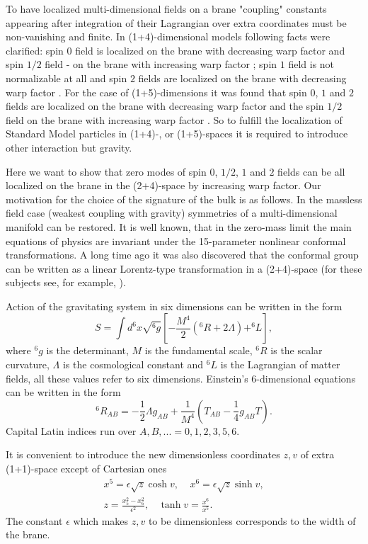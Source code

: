 \documentclass[a4paper,a4paper]{article}
\begin{document}
To have localized multi-dimensional fields on a brane "coupling"
constants appearing after integration of their Lagrangian over
extra coordinates must be non-vanishing and finite. In
(1+4)-dimensional models following facts were clarified: spin $0$
field is localized on the brane with decreasing warp factor and
spin $1/2$ field - on the brane with increasing warp factor
\cite{BaGa}; spin $1$ field is not normalizable at all \cite{Po}
and spin $2$ fields are localized on the brane with decreasing
warp factor \cite{RaSu,G1}. For the case of (1+5)-dimensions it
was found that spin $0$, $1$ and $2$ fields are localized on the
brane with decreasing warp factor and the spin $1/2$ field on the
brane with increasing warp factor \cite{Od}. So to fulfill the
localization of Standard Model particles in (1+4)-, or
(1+5)-spaces it is required to introduce other interaction but
gravity.

Here we want to show that zero modes of spin $0$, $1/2$, $1$ and $2$ 
fields can be all localized on the brane in the (2+4)-space by 
increasing warp factor. Our motivation for the choice of the 
signature of the bulk is as follows. In the massless field case 
(weakest coupling with gravity) symmetries of a multi-dimensional 
manifold can be restored. It is well known, that in the zero-mass 
limit the main equations of physics are invariant under the 
15-parameter nonlinear conformal transformations. A long time ago it 
was also discovered that the conformal group can be written as a 
linear Lorentz-type transformation in a (2+4)-space (for these 
subjects see, for example, \cite{PeRi}).

Action of the gravitating system in six dimensions can be written
in the form
\begin{equation} \label{action}
S = \int d^6x\sqrt{^6g}\left[- \frac{M^4}{2}(^6R + 2 \Lambda) +
^6L \right] ,
\end{equation}
where $^6g$ is the determinant, $M$ is the fundamental scale,
$^6R$ is the scalar curvature, $\Lambda$ is the cosmological
constant and $^6L$ is the Lagrangian of matter fields, all these
values refer to six dimensions. Einstein's 6-dimensional equations
can be written in the form
\begin{equation} \label{Einstein6}
^6R_{AB} = -\frac {1}{2}\Lambda g_{AB} + \frac {1}{M^4}\left(
T_{AB}- \frac {1}{4} g_{AB}T\right).
\end{equation}
Capital Latin indices run over $A, B,... = 0, 1, 2, 3, 5, 6 $.

It is convenient to introduce the new dimensionless coordinates
$z, v$ of extra (1+1)-space except of Cartesian ones
\begin{eqnarray} \label{coordinates}
x^5 = \epsilon\sqrt{z}\cosh{v} , ~~~~~ x^6 =
\epsilon\sqrt{z}\sinh{v} ,  \\
z =\frac{x^2_5-x^2_6}{\epsilon^2},~~~~\tanh{v} = \frac{x^6}{x^5} .
\nonumber
\end{eqnarray}
The constant $\epsilon $ which makes $z, v$ to be dimensionless
corresponds to the width of the brane.
\end{document}
